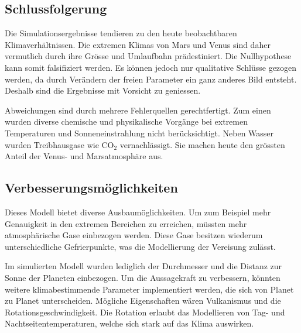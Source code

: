 \begin{refsection}
\section{Schlussfolgerung}

Die Simulationsergebnisse tendieren zu den heute beobachtbaren Klimaverhältnissen. Die extremen Klimas von Mars und Venus sind daher vermutlich durch ihre Grösse und Umlaufbahn prädestiniert. Die Nullhypothese kann somit falsifiziert werden. Es können jedoch nur qualitative Schlüsse gezogen werden, da durch Verändern der freien Parameter ein ganz anderes Bild entsteht. Deshalb sind die Ergebnisse mit Vorsicht zu geniessen.

Abweichungen sind durch mehrere Fehlerquellen gerechtfertigt. Zum einen wurden diverse chemische und physikalische Vorgänge bei extremen Temperaturen und Sonneneinstrahlung nicht berücksichtigt.
Neben Wasser wurden Treibhausgase wie CO$_2$ vernachlässigt. Sie machen heute den grössten Anteil der Venus- und Marsatmosphäre aus.

\subsection{Verbesserungsmöglichkeiten}

Dieses Modell bietet diverse Ausbaumöglichkeiten. Um zum Beispiel mehr Genauigkeit in den extremen Bereichen zu erreichen, müssten mehr atmosphärische Gase einbezogen werden.
Diese Gase besitzen wiederum unterschiedliche Gefrierpunkte, was die Modellierung der Vereisung zulässt.
		
Im simulierten Modell wurden lediglich der Durchmesser und die Distanz zur Sonne der Planeten einbezogen. Um die Aussagekraft zu verbessern, könnten weitere klimabestimmende Parameter implementiert werden, die sich von Planet zu Planet unterscheiden. Mögliche Eigenschaften wären Vulkanismus und die Rotationsgeschwindigkeit. Die Rotation erlaubt das Modellieren von Tag- und Nachtseitentemperaturen, welche sich stark auf das Klima auswirken.

\printbibliography[heading=subbibliography]
\end{refsection}
